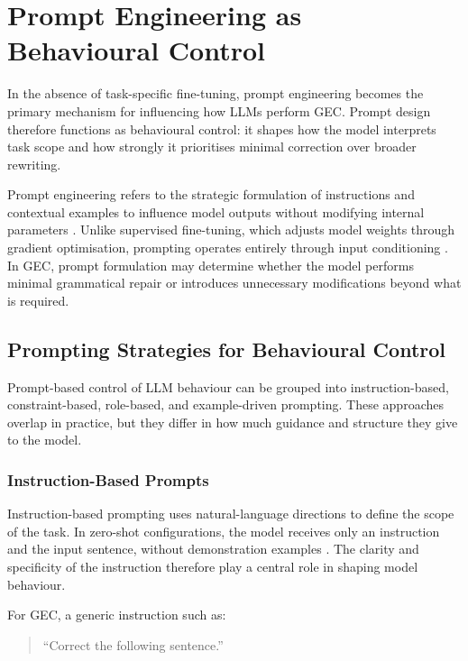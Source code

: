 \section{Prompt Engineering as Behavioural Control}

In the absence of task-specific fine-tuning, prompt engineering becomes the primary mechanism for influencing how LLMs perform GEC. Prompt design therefore functions as behavioural control: it shapes how the model interprets task scope and how strongly it prioritises minimal correction over broader rewriting.

Prompt engineering refers to the strategic formulation of instructions and contextual examples to influence model outputs without modifying internal parameters \cite{liu2023pretrain}. Unlike supervised fine-tuning, which adjusts model weights through gradient optimisation, prompting operates entirely through input conditioning \cite{NEURIPS2020_1457c0d6}. In GEC, prompt formulation may determine whether the model performs minimal grammatical repair or introduces unnecessary modifications beyond what is required.

\subsection{Prompting Strategies for Behavioural Control}

Prompt-based control of LLM behaviour can be grouped into instruction-based, constraint-based, role-based, and example-driven prompting. These approaches overlap in practice, but they differ in how much guidance and structure they give to the model.

\subsubsection{Instruction-Based Prompts}

Instruction-based prompting uses natural-language directions to define the scope of the task. In zero-shot configurations, the model receives only an instruction and the input sentence, without demonstration examples \cite{NEURIPS2020_1457c0d6}. The clarity and specificity of the instruction therefore play a central role in shaping model behaviour.

For GEC, a generic instruction such as:

\begin{quote}
``Correct the following sentence.''
\end{quote}

